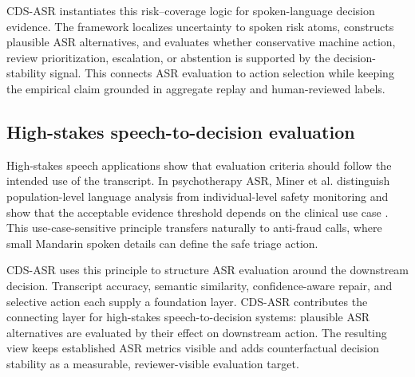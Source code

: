 CDS-ASR instantiates this risk--coverage logic for spoken-language decision evidence. The framework localizes uncertainty to spoken risk atoms, constructs plausible ASR alternatives, and evaluates whether conservative machine action, review prioritization, escalation, or abstention is supported by the decision-stability signal. This connects ASR evaluation to action selection while keeping the empirical claim grounded in aggregate replay and human-reviewed labels.

\subsection{High-stakes speech-to-decision evaluation}

High-stakes speech applications show that evaluation criteria should follow the intended use of the transcript. In psychotherapy ASR, Miner et al. distinguish population-level language analysis from individual-level safety monitoring and show that the acceptable evidence threshold depends on the clinical use case \citep{miner2020psychotherapy_asr}. This use-case-sensitive principle transfers naturally to anti-fraud calls, where small Mandarin spoken details can define the safe triage action.

CDS-ASR uses this principle to structure ASR evaluation around the downstream decision. Transcript accuracy, semantic similarity, confidence-aware repair, and selective action each supply a foundation layer. CDS-ASR contributes the connecting layer for high-stakes speech-to-decision systems: plausible ASR alternatives are evaluated by their effect on downstream action. The resulting view keeps established ASR metrics visible and adds counterfactual decision stability as a measurable, reviewer-visible evaluation target.
